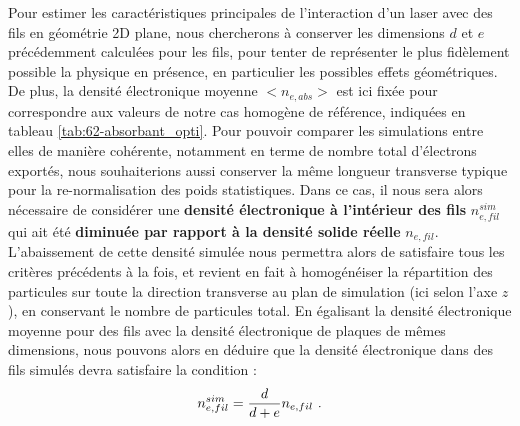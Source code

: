 \begin{refsection}
Pour estimer les caractéristiques principales de l'interaction d'un laser avec des fils en géométrie 2D plane, nous chercherons à conserver les dimensions $d$ et $e$ précédemment calculées pour les fils, pour tenter de représenter le plus fidèlement possible la physique en présence, en particulier les possibles effets géométriques. De plus, la densité électronique moyenne $<n_{e,abs}>$ est ici fixée pour correspondre aux valeurs de notre cas homogène de référence, indiquées en tableau \ref{tab:62-absorbant_opti}. Pour pouvoir comparer les simulations entre elles de manière cohérente, notamment en terme de nombre total d'électrons exportés, nous souhaiterions aussi conserver la même longueur transverse typique pour la re-normalisation des poids statistiques. Dans ce cas, il nous sera alors nécessaire de considérer une \textbf{densité électronique à l'intérieur des fils} $n_{e,fil}^{sim}$ qui ait été \textbf{diminuée par rapport à la densité solide réelle} $n_{e,fil}$. L'abaissement de cette densité simulée nous permettra alors de satisfaire tous les critères précédents à la fois, et revient en fait à homogénéiser la répartition des particules sur toute la direction transverse au plan de simulation (ici selon l'axe $z$), en conservant le nombre de particules total. En égalisant la densité électronique moyenne pour des fils avec la densité électronique de plaques de mêmes dimensions, nous pouvons alors en déduire que la densité électronique dans des fils simulés devra satisfaire la condition :
\begin{equation}
n_{e,fil}^{sim}= \dfrac{d}{d+e} n_{e,fil} ~ \rm .
\end{equation}


\end{refsection}
